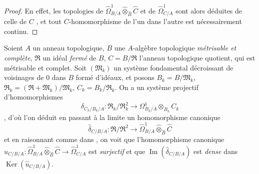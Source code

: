 \begin{proof}
En effet, les topologies de
$\widehat{\Omega}^1_{B/A}\widehat\otimes_{\widehat B}\widehat C$ et de
$\widehat{\Omega}^1_{C/A}$ sont alors déduites de celle de $C$
, et tout $C$-homomorphisme de l'un dans l'autre est
nécessairement continu.
\end{proof}

\begin{env}[20.7.20]
\label{0.20.7.20-fr}
Soient $A$ un anneau topologique, $B$ une $A$-algèbre topologique
\emph{métrisable et complète}, $\mathfrak{R}$ un idéal \emph{fermé} de $B$,
$C=B/\mathfrak{R}$ l'anneau topologique quotient, qui est métrisable et
complet. Soit $(\mathfrak{M}_k)$ un système fondamental décroissant de
voisinages de $0$ dans $B$ formé d'idéaux, et posons
$B_k=B/\mathfrak{M}_k$,
$\mathfrak{R}_k=(\mathfrak{R}+\mathfrak{M}_k)/\mathfrak{M}_k$,
$C_k=B_k/\mathfrak{R}_k$. On a un système projectif d'homomorphismes
\[
  \delta_{C_k/B_k/A}:\mathfrak{R}_k/\mathfrak{R}_k^2\to
  \Omega^1_{B_k/A}\otimes_{B_k}C_k
\]
, d'où l'on déduit en passant à la limite un
homomorphisme canonique
\[
  \widehat\delta_{C/B/A}:\mathfrak{R}/\mathfrak{R}^2\to
  \widehat{\Omega}^1_{B/A}\widehat\otimes_{\widehat B}\widehat C
\]
et en raisonnant comme dans , on voit que l'homomorphisme
canonique
$\widehat u_{C/B/A}:\widehat{\Omega}^1_{B/A}
\widehat\otimes_{\widehat B}\widehat C\to\widehat{\Omega}^1_{C/A}$ est
\emph{surjectif} et que $\operatorname{Im}(\widehat\delta_{C/B/A})$ est
\emph{dense} dans $\operatorname{Ker}(\widehat u_{C/B/A})$.
\end{env}
